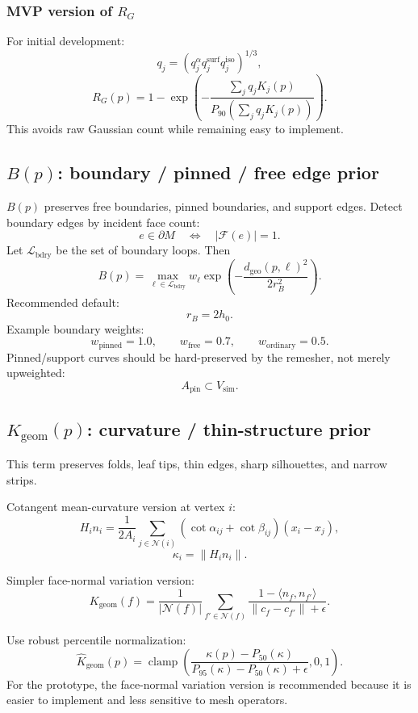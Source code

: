 \documentclass[11pt,a4paper]{article}
\newcommand{\clamp}{\operatorname{clamp}}
\begin{document}
\subsubsection{MVP version of $R_G$}

For initial development:
\[
q_j=\left(q_j^\alpha q_j^{\mathrm{surf}}q_j^{\mathrm{iso}}\right)^{1/3},
\]
\[
R_G(p)=1-\exp\left(-\frac{\sum_j q_jK_j(p)}{P_{90}(\sum_j q_jK_j(p))}\right).
\]
This avoids raw Gaussian count while remaining easy to implement.

\subsection{$B(p)$: boundary / pinned / free edge prior}

$B(p)$ preserves free boundaries, pinned boundaries, and support edges. Detect boundary edges by incident face count:
\[
e\in\partial M \quad\Longleftrightarrow\quad |\mathcal{F}(e)|=1.
\]
Let $\mathcal{L}_{\mathrm{bdry}}$ be the set of boundary loops. Then
\[
B(p)=\max_{\ell\in\mathcal{L}_{\mathrm{bdry}}}
 w_\ell \exp\left(-\frac{d_{\mathrm{geo}}(p,\ell)^2}{2r_B^2}\right).
\]
Recommended default:
\[
r_B=2h_0.
\]
Example boundary weights:
\[
w_{\mathrm{pinned}}=1.0,
\qquad
w_{\mathrm{free}}=0.7,
\qquad
w_{\mathrm{ordinary}}=0.5.
\]
Pinned/support curves should be hard-preserved by the remesher, not merely upweighted:
\[
A_{\mathrm{pin}}\subset V_{\mathrm{sim}}.
\]

\subsection{$K_{\mathrm{geom}}(p)$: curvature / thin-structure prior}

This term preserves folds, leaf tips, thin edges, sharp silhouettes, and narrow strips.

Cotangent mean-curvature version at vertex $i$:
\[
H_i n_i=\frac{1}{2A_i}\sum_{j\in\mathcal{N}(i)}
(\cot\alpha_{ij}+\cot\beta_{ij})(x_i-x_j),
\]
\[
\kappa_i=\|H_i n_i\|.
\]

Simpler face-normal variation version:
\[
K_{\mathrm{geom}}(f)=
\frac{1}{|\mathcal{N}(f)|}
\sum_{f'\in\mathcal{N}(f)}
\frac{1-\langle n_f,n_{f'}\rangle}{\|c_f-c_{f'}\|+\epsilon}.
\]

Use robust percentile normalization:
\[
\widehat{K}_{\mathrm{geom}}(p)=
\clamp\left(
\frac{\kappa(p)-P_{50}(\kappa)}{P_{95}(\kappa)-P_{50}(\kappa)+\epsilon},0,1
\right).
\]
For the prototype, the face-normal variation version is recommended because it is easier to implement and less sensitive to mesh operators.
\end{document}
